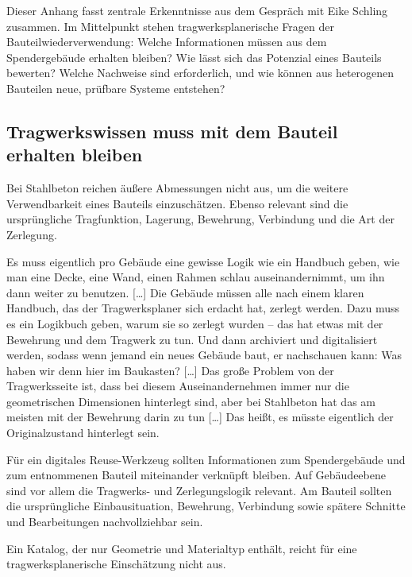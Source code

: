 \label{anlage:interview-schling}

Dieser Anhang fasst zentrale Erkenntnisse aus dem Gespräch mit Eike Schling zusammen. Im Mittelpunkt stehen tragwerksplanerische Fragen der Bauteilwiederverwendung: Welche Informationen müssen aus dem Spendergebäude erhalten bleiben? Wie lässt sich das Potenzial eines Bauteils bewerten? Welche Nachweise sind erforderlich, und wie können aus heterogenen Bauteilen neue, prüfbare Systeme entstehen?

\subsection{Tragwerkswissen muss mit dem Bauteil erhalten bleiben}

Bei Stahlbeton reichen äußere Abmessungen nicht aus, um die weitere Verwendbarkeit eines Bauteils einzuschätzen. Ebenso relevant sind die ursprüngliche Tragfunktion, Lagerung, Bewehrung, Verbindung und die Art der Zerlegung.

\begin{Blockquote}
Es muss eigentlich pro Gebäude eine gewisse Logik wie ein Handbuch geben, wie man eine Decke, eine Wand, einen Rahmen schlau auseinandernimmt, um ihn dann weiter zu benutzen. […] Die Gebäude müssen alle nach einem klaren Handbuch, das der Tragwerksplaner sich erdacht hat, zerlegt werden. Dazu muss es ein Logikbuch geben, warum sie so zerlegt wurden – das hat etwas mit der Bewehrung und dem Tragwerk zu tun. Und dann archiviert und digitalisiert werden, sodass wenn jemand ein neues Gebäude baut, er nachschauen kann: Was haben wir denn hier im Baukasten? […] Das große Problem von der Tragwerksseite ist, dass bei diesem Auseinandernehmen immer nur die geometrischen Dimensionen hinterlegt sind, aber bei Stahlbeton hat das am meisten mit der Bewehrung darin zu tun […] Das heißt, es müsste eigentlich der Originalzustand hinterlegt sein.
\end{Blockquote}

Für ein digitales Reuse-Werkzeug sollten Informationen zum Spendergebäude und zum entnommenen Bauteil miteinander verknüpft bleiben. Auf Gebäudeebene sind vor allem die Tragwerks- und Zerlegungslogik relevant. Am Bauteil sollten die ursprüngliche Einbausituation, Bewehrung, Verbindung sowie spätere Schnitte und Bearbeitungen nachvollziehbar sein.

Ein Katalog, der nur Geometrie und Materialtyp enthält, reicht für eine tragwerksplanerische Einschätzung nicht aus.

